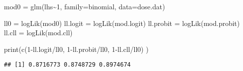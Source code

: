 \documentclass[
]{article}
\newenvironment{Shaded}{\begin{snugshade}}{\end{snugshade}}
\newcommand{\AttributeTok}[1]{\textcolor[rgb]{0.77,0.63,0.00}{#1}}
\newcommand{\DecValTok}[1]{\textcolor[rgb]{0.00,0.00,0.81}{#1}}
\newcommand{\FunctionTok}[1]{\textcolor[rgb]{0.00,0.00,0.00}{#1}}
\newcommand{\NormalTok}[1]{#1}
\newcommand{\OtherTok}[1]{\textcolor[rgb]{0.56,0.35,0.01}{#1}}
\newcommand{\SpecialCharTok}[1]{\textcolor[rgb]{0.00,0.00,0.00}{#1}}
\newcommand{\StringTok}[1]{\textcolor[rgb]{0.31,0.60,0.02}{#1}}
\begin{document}
\begin{Shaded}
\begin{Highlighting}[]
\NormalTok{mod0 }\OtherTok{=} \FunctionTok{glm}\NormalTok{(lhs}\SpecialCharTok{\textasciitilde{}}\DecValTok{1}\NormalTok{, }\AttributeTok{family=}\NormalTok{binomial, }\AttributeTok{data=}\NormalTok{dose.dat)}

\NormalTok{ll0 }\OtherTok{=} \FunctionTok{logLik}\NormalTok{(mod0)}
\NormalTok{ll.logit }\OtherTok{=} \FunctionTok{logLik}\NormalTok{(mod.logit)}
\NormalTok{ll.probit }\OtherTok{=} \FunctionTok{logLik}\NormalTok{(mod.probit)}
\NormalTok{ll.cll }\OtherTok{=} \FunctionTok{logLik}\NormalTok{(mod.cll)}


\FunctionTok{print}\NormalTok{(}\FunctionTok{c}\NormalTok{(}\DecValTok{1}\SpecialCharTok{{-}}\NormalTok{ll.logit}\SpecialCharTok{/}\NormalTok{ll0, }\DecValTok{1}\SpecialCharTok{{-}}\NormalTok{ll.probit}\SpecialCharTok{/}\NormalTok{ll0, }\DecValTok{1}\SpecialCharTok{{-}}\NormalTok{ll.cll}\SpecialCharTok{/}\NormalTok{ll0) )}
\end{Highlighting}
\end{Shaded}

\begin{verbatim}
## [1] 0.8716773 0.8748729 0.8974674
\end{verbatim}

\begin{Shaded}
\end{Shaded}
\end{document}

